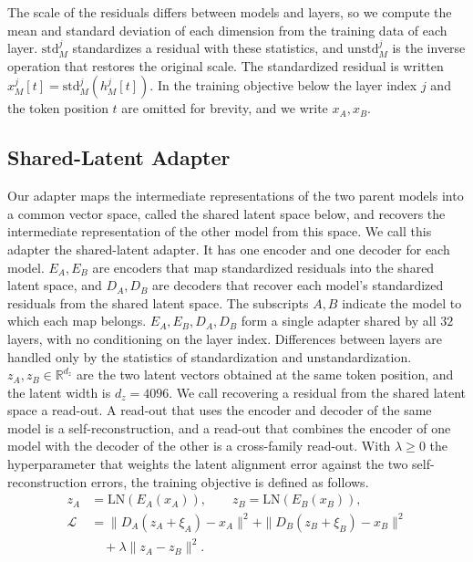 \documentclass[conference]{IEEEtran}
\begin{document}
The scale of the residuals differs between models and layers, so we compute the mean and standard deviation of each dimension from
the training data of each layer. $\mathrm{std}_M^j$ standardizes a residual with these statistics, and $\mathrm{unstd}_M^j$ is the
inverse operation that restores the original scale. The standardized residual is written $x_M^j[t]=\mathrm{std}_M^j(h_M^j[t])$. In the
training objective below the layer index $j$ and the token position $t$ are omitted for brevity, and we write $x_A,x_B$.

\subsection{Shared-Latent Adapter}\label{sec:adapter}
Our adapter maps the intermediate representations of the two parent models into a common vector space, called the shared latent
space below, and recovers the intermediate representation of the other model from this space. We call this adapter the shared-latent
adapter. It has one encoder and one decoder for each model. $E_A,E_B$ are encoders that map standardized residuals into the shared
latent space, and $D_A,D_B$ are decoders that recover each model's standardized residuals from the shared latent space. The subscripts
$A,B$ indicate the model to which each map belongs.
$E_A,E_B,D_A,D_B$ form a single adapter shared by all $32$ layers, with no conditioning on the layer index. Differences between layers
are handled only by the statistics of standardization and unstandardization.
$z_A,z_B\in\mathbb R^{d_z}$ are the two latent vectors obtained at the same token position, and the latent width is $d_z{=}4096$.
We call recovering a residual from the shared latent space a read-out. A read-out that uses the encoder and decoder of the same model
is a self-reconstruction, and a read-out that combines the encoder of one model with the decoder of the other is a cross-family
read-out.
With $\lambda\geq0$ the hyperparameter that weights the latent alignment error against the two self-reconstruction errors, the
training objective is defined as follows.
\begin{equation}\label{eq:adapter-objective}
\begin{aligned}
z_A &= \mathrm{LN}(E_A(x_A)),\qquad z_B = \mathrm{LN}(E_B(x_B)),\\
\mathcal{L} &=
\|D_A(z_A{+}\xi_A){-}x_A\|^2+\|D_B(z_B{+}\xi_B){-}x_B\|^2\\
&\quad+\lambda\|z_A{-}z_B\|^2 .
\end{aligned}
\end{equation}
\end{document}
